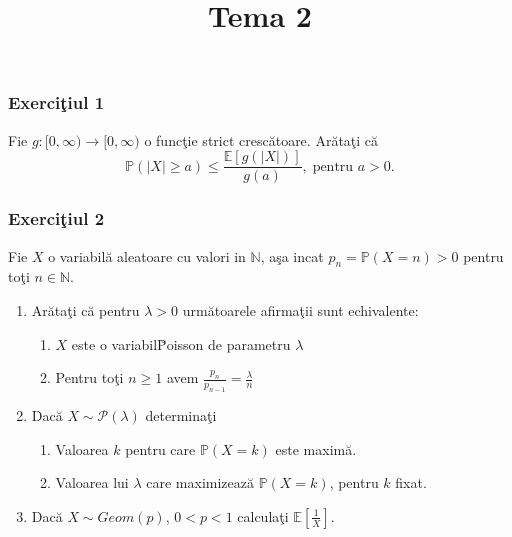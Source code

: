 \documentclass[]{article}
\title{Tema 2}
\author{}
\date{}
\def\l{{\lambda}}
\def\PP{{\mathbb P}}
\def\EE{{\mathbb E}}
\def\NN{{\mathbb N}}
\def\MP{{\mathcal P}}
\begin{document}
\maketitle

\thispagestyle{fancy}

\subsubsection{\texorpdfstring{Exerci\c tiul
1}{Exerciiul 1}}\label{exerciiul-1}

Fie \(g:[0,\infty)\to[0, \infty)\) o func\c tie strict cresc\u atoare.
Ar\u ata\c ti c\u a \[
  \PP\left(|X|\geq a\right)\leq\frac{\EE\left[g(|X|)\right]}{g(a)}, \; \mbox{pentru $a>0$.}
\]

\subsubsection{\texorpdfstring{Exerci\c tiul
2}{Exerciiul 2}}\label{exerciiul-2}

Fie \(X\) o variabil\u a aleatoare cu valori in \(\NN\), a\c sa incat
\(p_n=\PP(X=n)>0\) pentru to\c ti \(n\in\NN\).

\begin{enumerate}
\def\labelenumi{\alph{enumi})}
\item
  Ar\u ata\c ti c\u a pentru \(\l>0\) urm\u atoarele afirma\c tii sunt
  echivalente:

  \begin{enumerate}
  \def\labelenumii{\roman{enumii})}
  \item
    \(X\) este o variabil\u Poisson de parametru \(\l\)
  \item
    Pentru to\c ti \(n\geq1\) avem \(\frac{p_n}{p_{n-1}}=\frac{\l}{n}\)
  \end{enumerate}
\item
  Dac\u a \(X\sim\MP(\l)\) determina\c ti

  \begin{enumerate}
  \def\labelenumii{\roman{enumii})}
  \item
    Valoarea \(k\) pentru care \(\PP(X=k)\) este maxim\u a.
  \item
    Valoarea lui \(\l\) care maximizeaz\u a \(\PP(X=k)\), pentru \(k\)
    fixat.
  \end{enumerate}
\item
  Dac\u a \(X\sim Geom(p)\), \(0<p<1\) calcula\c ti
  \(\EE\left[\frac{1}{X}\right]\).
\end{enumerate}
\end{document}
